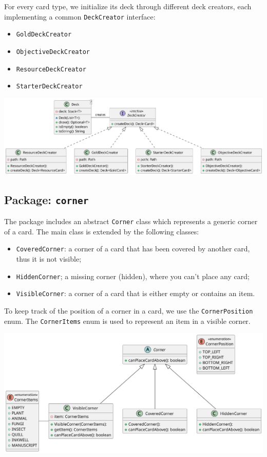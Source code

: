 \documentclass{article}
\begin{document}
\noindent For every card type, we initialize its deck through different deck creators, each implementing a common \texttt{DeckCreator} interface:
\begin{itemize}
    \item \texttt{GoldDeckCreator}
    \item \texttt{ObjectiveDeckCreator}
    \item \texttt{ResourceDeckCreator}
    \item \texttt{StarterDeckCreator}
\end{itemize}

\vspace{1cm}
\begin{center}
    \hspace*{-1.8cm}\includegraphics[scale=0.15]{pngs/deck}
\end{center}

\newpage
\subsection{Package: \texttt{corner}}
The package includes an abstract \texttt{Corner} class which represents a generic corner of a card.
The main class is extended by the following classes:
\begin{itemize}
    \item \texttt{CoveredCorner}: a corner of a card that has been covered by another card, thus it is not visible;
    \item \texttt{HiddenCorner}; a missing corner (hidden), where you can't place any card;
    \item \texttt{VisibleCorner}: a corner of a card that is either empty or contains an item.
\end{itemize}
To keep track of the position of a corner in a card, we use the \texttt{CornerPosition} enum.
\noindent
The \texttt{CornerItems} enum is used to represent an item in a visible corner.
\vspace{1cm}
\begin{center}
    \hspace*{-2cm}\includegraphics[scale=0.15]{pngs/corner}
\end{center}
\end{document}
